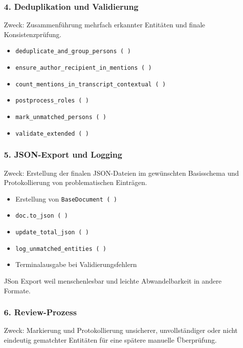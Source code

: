\documentclass[12pt, a4paper, ngerman, bidi=default]{article}
\begin{document}
\subsubsection*{4. Deduplikation und Validierung}
Zweck: Zusammenführung mehrfach erkannter Entitäten und finale Konsistenzprüfung.
\begin{itemize}
\item \texttt{deduplicate\_and\_group\_persons~(~)}
\item \texttt{ensure\_author\_recipient\_in\_mentions~(~)}
\item \texttt{count\_mentions\_in\_transcript\_contextual~(~)}
\item \texttt{postprocess\_roles~(~)}
\item \texttt{mark\_unmatched\_persons~(~)}
\item \texttt{validate\_extended~(~)}
\end{itemize}

\subsubsection*{5. JSON-Export und Logging}
Zweck: Erstellung der finalen JSON-Dateien im gewünschten Basisschema und Protokollierung von problematischen Einträgen.
\begin{itemize}
\item Erstellung von \texttt{BaseDocument~(~)}
\item \texttt{doc.to\_json~(~)}
\item \texttt{update\_total\_json~(~)}
\item \texttt{log\_unmatched\_entities~(~)}
\item Terminalausgabe bei Validierungsfehlern
\end{itemize}

JSon Export weil menschenlesbar und leichte Abwandelbarkeit in andere Formate.

\subsubsection*{6. Review-Prozess}
Zweck: Markierung und Protokollierung unsicherer, unvollständiger oder nicht eindeutig gematchter Entitäten für eine spätere manuelle Überprüfung.
\end{document}
